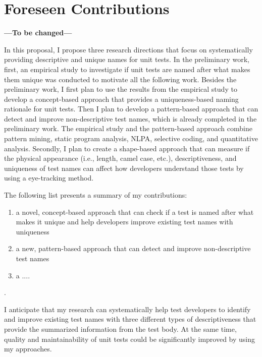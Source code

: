 \section{Foreseen Contributions}
\label{sec:contributions}

\textbf{---To be changed---}

In this proposal, I propose three research directions that focus on systematically providing descriptive and unique names for unit tests.
%
In the preliminary work, first, an empirical study to investigate if unit tests are named after what makes them unique was conducted to motivate all the following work.
%
Besides the preliminary work, I first plan to use the results from the empirical study to develop a concept-based approach that provides a uniqueness-based naming rationale for unit tests.
%
Then I plan to develop a pattern-based approach that can detect and improve non-descriptive test names, which is already completed in the preliminary work.
%
The empirical study and the pattern-based approach combine pattern mining, static program analysis, NLPA, selective coding, and quantitative analysis.
%
Secondly, I plan to create a shape-based approach that can measure if the physical appearance (i.e., length, camel case, etc.), descriptiveness, and uniqueness of test names can affect how developers understand those tests by using a eye-tracking method.

The following list presents a summary of my contributions:
\begin{enumerate}
    \item a novel, concept-based approach that can check if a test is named after what makes it unique and help developers improve existing test names with uniqueness
    \item a new, pattern-based approach that can detect and improve non-descriptive test names
    \item a ....
\end{enumerate}.

I anticipate that my research can systematically help test developers to identify and improve existing test names with three different types of descriptiveness that provide the summarized information from the test body.
%
At the same time, quality and maintainability of unit tests could be significantly improved by using my approaches.